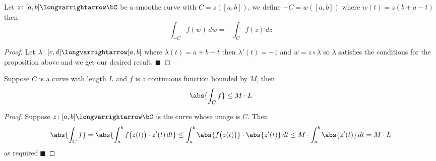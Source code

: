 \documentclass[10pt]{article}
\let\longto=\longvarrightarrow
\def\qed{\hskip1cm\hbox{}\hfill$\blacksquare$}
\begin{document}
\begin{prop*}

    Let $z\colon[a,b]\longto\bC$ be a smoothe curve with $C=z([a,b])$, we define $-C=w([a,b])$ where $w(t)=z(b+a-t)$ then
    \[ \int_{-C} f(w)\,dw = -\int_C f(z)\,dz \]

\end{prop*}

\begin{proof}

    Let $\lambda\colon[c,d]\longto[a,b]$ where $\lambda(t)=a+b-t$ then $\lambda'(t)=-1$ and $w=z\circ\lambda$ so $\lambda$ satisfies the conditions for the proposition above and we get our desired result.
    \qed

\end{proof}

\begin{prop*}

    Suppose $C$ is a curve with length $L$ and $f$ is a continuous function bounded by $M$, then
    \[ \abs{\int_C f}\leq M\cdot L \]

\end{prop*}

\begin{proof}

    Suppose $z\colon[a,b]\longto\bC$ is the curve whose image is $C$.
    Then
    \[ \abs{\int_C f} = \abs{\int_a^b f\bigl(z(t)\bigr)\cdot z'(t)\,dt} \leq \int_a^b \abs{f\bigl(z(t)\bigr)}\cdot \abs{z'(t)}\,dt \leq M\cdot\int_a^b\abs{z'(t)}\,dt = M\cdot L \]
    as required.\qed

\end{proof}
\end{document}
